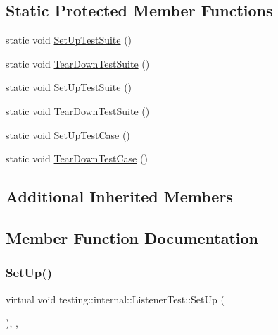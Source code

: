 \subsection*{Static Protected Member Functions}
\begin{DoxyCompactItemize}
\item 
static void \mbox{\hyperlink{classtesting_1_1internal_1_1_listener_test_a413d95ed635bc344add7f3ac3c459962}{Set\+Up\+Test\+Suite}} ()
\item 
static void \mbox{\hyperlink{classtesting_1_1internal_1_1_listener_test_a5b4dc58bd218f9893c79c2f2bbd85dd0}{Tear\+Down\+Test\+Suite}} ()
\item 
static void \mbox{\hyperlink{classtesting_1_1internal_1_1_listener_test_a413d95ed635bc344add7f3ac3c459962}{Set\+Up\+Test\+Suite}} ()
\item 
static void \mbox{\hyperlink{classtesting_1_1internal_1_1_listener_test_a5b4dc58bd218f9893c79c2f2bbd85dd0}{Tear\+Down\+Test\+Suite}} ()
\item 
static void \mbox{\hyperlink{classtesting_1_1internal_1_1_listener_test_a7cbc298576e584b4021d0375204b7391}{Set\+Up\+Test\+Case}} ()
\item 
static void \mbox{\hyperlink{classtesting_1_1internal_1_1_listener_test_aa35b5f1c6235f0fe98aa2c7f35bb8fe1}{Tear\+Down\+Test\+Case}} ()
\end{DoxyCompactItemize}
\subsection*{Additional Inherited Members}


\subsection{Member Function Documentation}
\mbox{\label{classtesting_1_1internal_1_1_listener_test_ace3dbe36b705ddf320518e6cdd919bc8}} 
\subsubsection{\texorpdfstring{SetUp()}{SetUp()}\hspace{0.1cm}{\footnotesize\ttfamily [1/3]}}
{\footnotesize\ttfamily virtual void testing\+::internal\+::\+Listener\+Test\+::\+Set\+Up (\begin{DoxyParamCaption}{ }\end{DoxyParamCaption})\hspace{0.3cm}{\ttfamily [inline]}, {\ttfamily [protected]}, {\ttfamily [virtual]}}




